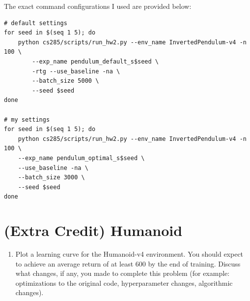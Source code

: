 \documentclass{article}
\begin{document}
\begin{sol}
    The exact command configurations I used are provided below:
\begin{lstlisting}
# default settings
for seed in $(seq 1 5); do
    python cs285/scripts/run_hw2.py --env_name InvertedPendulum-v4 -n 100 \
        --exp_name pendulum_default_s$seed \
        -rtg --use_baseline -na \
        --batch_size 5000 \
        --seed $seed
done

# my settings
for seed in $(seq 1 5); do
    python cs285/scripts/run_hw2.py --env_name InvertedPendulum-v4 -n 100 \
    --exp_name pendulum_optimal_s$seed \
    --use_baseline -na \
    --batch_size 3000 \
    --seed $seed
done
\end{lstlisting}

\end{sol}

\newpage\section{(Extra Credit) Humanoid}
\begin{enumerate}
    \item Plot a learning curve for the Humanoid-v4 environment. You should expect to achieve an average return of at least 600 by the end of training. Discuss what changes, if any, you made to complete this problem (for example: optimizations to the original code, hyperparameter changes, algorithmic changes).
\end{enumerate}
\end{document}
